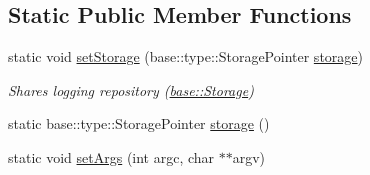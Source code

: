 \subsection*{Static Public Member Functions}
\begin{DoxyCompactItemize}
\item 
static void \hyperlink{classel_1_1Helpers_af78fd39725281e3dddd7c0fbdc14f11f}{set\+Storage} (base\+::type\+::\+Storage\+Pointer \hyperlink{classel_1_1Helpers_a13a5365de36b3af27660cf9b358829d3}{storage})\hypertarget{classel_1_1Helpers_af78fd39725281e3dddd7c0fbdc14f11f}{}\label{classel_1_1Helpers_af78fd39725281e3dddd7c0fbdc14f11f}

\begin{DoxyCompactList}\small\item\em Shares logging repository (\hyperlink{classel_1_1base_1_1Storage}{base\+::\+Storage}) \end{DoxyCompactList}\item 
static base\+::type\+::\+Storage\+Pointer \hyperlink{classel_1_1Helpers_a13a5365de36b3af27660cf9b358829d3}{storage} ()
\item 
static void \hyperlink{classel_1_1Helpers_a68748f618a0c2840b96dc12532b09bf0}{set\+Args} (int argc, char $\ast$$\ast$argv)\hypertarget{classel_1_1Helpers_a68748f618a0c2840b96dc12532b09bf0}{}\label{classel_1_1Helpers_a68748f618a0c2840b96dc12532b09bf0}


\end{DoxyCompactItemize}
